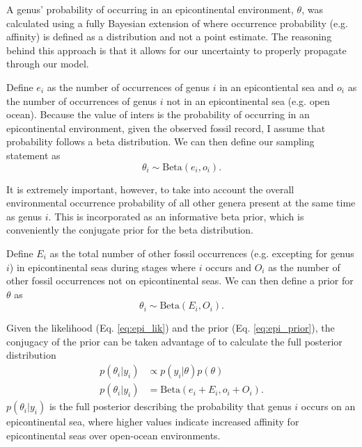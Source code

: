 \documentclass[12pt,letterpaper]{article}
\begin{document}
A genus' probability of occurring in an epicontinental environment, \(\theta\), was calculated using a fully Bayesian extension of \citet{Simpson2009} where occurrence probability (e.g. affinity) is defined as a distribution and not a point estimate. The reasoning behind this approach is that it allows for our uncertainty to properly propagate through our model.

Define \(e_{i}\) as the number of occurrences of genus \(i\) in an epicontiental sea and \(o_{i}\) as the number of occurrences of genus \(i\) not in an epicontinental sea (e.g. open ocean). Because the value of inters is the probability of occurring in an epicontinental environment, given the observed fossil record, I assume that probability follows a beta distribution. We can then define our sampling statement as
\begin{equation}
  \theta_{i} \sim \mathrm{Beta}(e_{i}, o_{i}).
  \label{eq:epi_lik}
\end{equation}

It is extremely important, however, to take into account the overall environmental occurrence probability of all other genera present at the same time as genus \(i\). This is incorporated as an informative beta prior, which is conveniently the conjugate prior for the beta distribution. 

Define \(E_{i}\) as the total number of other fossil occurrences (e.g. excepting for genus \(i\)) in epicontinental seas during stages where \(i\) occurs and \(O_{i}\) as the number of other fossil occurrences not on epicontinental seas. We can then define a prior for \(\theta\) as
\begin{equation}
  \theta_{i} \sim \mathrm{Beta}(E_{i}, O_{i}).
  \label{eq:epi_prior}
\end{equation}

Given the likelihood (Eq. \ref{eq:epi_lik}) and the prior (Eq. \ref{eq:epi_prior}), the conjugacy of the prior can be taken advantage of to calculate the full posterior distribution
\begin{equation}
  \begin{aligned}
    p(\theta_{i} | y_{i}) &\propto p(y_{i} | \theta) p(\theta) \\
    p(\theta_{i} | y_{i}) &= \mathrm{Beta}(e_{i} + E_{i}, o_{i} + O_{i}).
  \end{aligned}
  \label{eq:epi_post}
\end{equation}
\(p(\theta_{i} | y_{i})\) is the full posterior describing the probability that genus \(i\) occurs on an epicontinental sea, where higher values indicate increased affinity for epicontinental seas over open-ocean environments.
\end{document}
